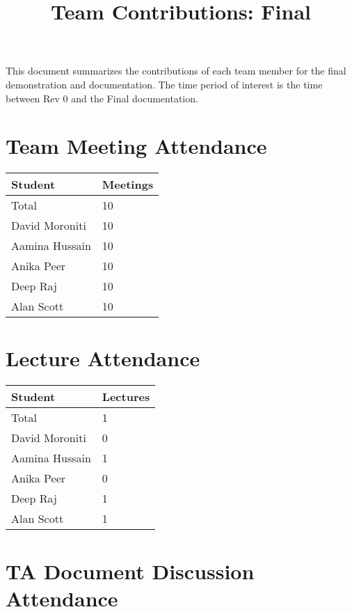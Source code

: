 \documentclass{article}
\title{Team Contributions: Final\\\progname}
\author{\authname}
\date{}
\begin{document}
\maketitle

This document summarizes the contributions of each team member for the final
demonstration and documentation.  The time period of interest is the time
between Rev 0 and the Final documentation.

\section{Team Meeting Attendance}

\begin{table}[H]
\centering
\begin{tabular}{ll}
\toprule
\textbf{Student} & \textbf{Meetings}\\
\midrule
Total & 10\\
David Moroniti & 10\\
Aamina Hussain & 10\\
Anika Peer & 10\\
Deep Raj & 10\\
Alan Scott & 10\\
\bottomrule
\end{tabular}
\end{table}


\section{Lecture Attendance}

\begin{table}[H]
\centering
\begin{tabular}{ll}
\toprule
\textbf{Student} & \textbf{Lectures}\\
\midrule
Total & 1\\
David Moroniti & 0\\
Aamina Hussain & 1\\
Anika Peer & 0\\
Deep Raj & 1\\
Alan Scott & 1\\
\bottomrule
\end{tabular}
\end{table}

\section{TA Document Discussion Attendance}
\end{document}
